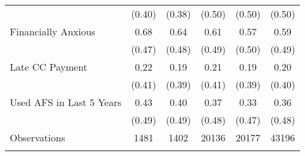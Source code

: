 {\begin{tabular}{l*{5}{c}}
                    &      (0.40)&      (0.38)&      (0.50)&      (0.50)&      (0.50)\\
Financially Anxious&        0.68&        0.64&        0.61&        0.57&        0.59\\
                    &      (0.47)&      (0.48)&      (0.49)&      (0.50)&      (0.49)\\
Late CC Payment    &        0.22&        0.19&        0.21&        0.19&        0.20\\
                    &      (0.41)&      (0.39)&      (0.41)&      (0.39)&      (0.40)\\
Used AFS in Last 5 Years&        0.43&        0.40&        0.37&        0.33&        0.36\\
                    &      (0.49)&      (0.49)&      (0.48)&      (0.47)&      (0.48)\\
 Observations                   &        1481&        1402&       20136&       20177&       43196 \\
\hline\hline
\multicolumn{6}{l}{\footnotesize }\\
\end{tabular}
}
